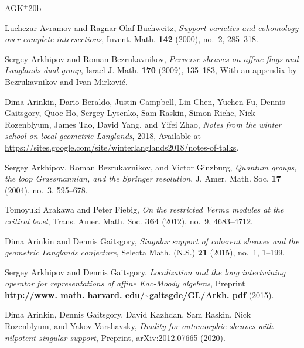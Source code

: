 \clearpage
{}
{}
\renewcommand{\refname}{参考文献}
\setlength{\emergencystretch}{2.5em}
\providecommand{\etalchar}[1]{$^{#1}$}
\providecommand{\bysame}{\leavevmode\hbox to3em{\hrulefill}\thinspace}
\begin{thebibliography}{AGK{\etalchar{+}}20b}

Luchezar Avramov and Ragnar-Olaf Buchweitz, \emph{Support varieties and
  cohomology over complete intersections}, Invent. Math. \textbf{142} (2000),
  no.~2, 285--318.

Sergey Arkhipov and Roman Bezrukavnikov, \emph{Perverse sheaves on affine flags
  and {L}anglands dual group}, Israel J. Math. \textbf{170} (2009), 135--183,
  With an appendix by Bezrukavnikov and Ivan Mirkovi\'{c}.

\bibitem[ABC{\etalchar{+}}18]{paris-notes}
Dima Arinkin, Dario Beraldo, Justin Campbell, Lin Chen, Yuchen Fu, Dennis
  Gaitsgory, Quoc Ho, Sergey Lysenko, Sam Raskin, Simon Riche, Nick Rozenblyum,
  James Tao, David Yang, and Yifei Zhao, \emph{{Notes from the winter school on
  local geometric {L}anglands}}, 2018, Available at
  \url{https://sites.google.com/site/winterlanglands2018/notes-of-talks}.

Sergey Arkhipov, Roman Bezrukavnikov, and Victor Ginzburg, \emph{Quantum
  groups, the loop {G}rassmannian, and the {S}pringer resolution}, J. Amer.
  Math. Soc. \textbf{17} (2004), no.~3, 595--678.

Tomoyuki Arakawa and Peter Fiebig, \emph{On the restricted {V}erma modules at
  the critical level}, Trans. Amer. Math. Soc. \textbf{364} (2012), no.~9,
  4683--4712.

Dima Arinkin and Dennis Gaitsgory, \emph{Singular support of coherent sheaves
  and the geometric {L}anglands conjecture}, Selecta Math. (N.S.) \textbf{21}
  (2015), no.~1, 1--199.

Sergey Arkhipov and Dennis Gaitsgory, \emph{Localization and the long
  intertwining operator for representations of affine {K}ac-{M}oody algebras},
  Preprint \textbf{\url{http://www. math. harvard. edu/~gaitsgde/GL/Arkh. pdf}}
  (2015).

\bibitem[AGK{\etalchar{+}}20a]{restrictedvar2}
Dima Arinkin, Dennis Gaitsgory, David Kazhdan, Sam Raskin, Nick Rozenblyum, and
  Yakov Varshavsky, \emph{Duality for automorphic sheaves with nilpotent
  singular support}, Preprint, arXiv:2012.07665 (2020).


\end{thebibliography}
